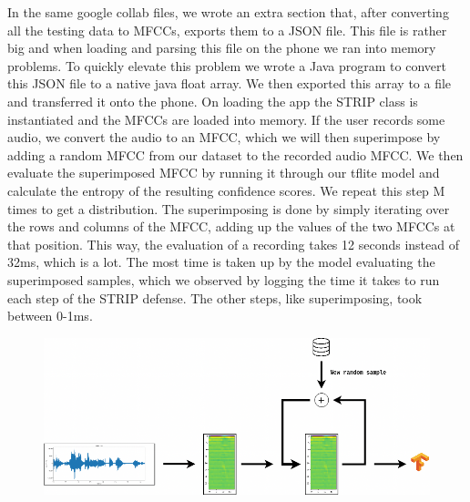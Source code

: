 \documentclass{report}
\theoremstyle{definition}
\theoremstyle{remark}
\begin{document}
In the same google collab files, we wrote an extra section that, after converting all the testing data to MFCCs, exports them to a JSON file. This file is rather big and when loading and parsing this file on the phone we ran into memory problems. To quickly elevate this problem we wrote a Java program to convert this JSON file to a native java float array. We then exported this array to a file and transferred it onto the phone. On loading the app the STRIP class is instantiated and the MFCCs are loaded into memory. If the user records some audio, we convert the audio to an MFCC, which we will then superimpose by adding a random MFCC from our dataset to the recorded audio MFCC. We then evaluate the superimposed MFCC by running it through our tflite model and calculate the entropy of the resulting confidence scores. We repeat this step M times to get a distribution. The superimposing is done by simply iterating over the rows and columns of the MFCC, adding up the values of the two MFCCs at that position. This way, the evaluation of a recording takes 12 seconds instead of 32ms, which is a lot. The most time is taken up by the model evaluating the superimposed samples, which we observed by logging the time it takes to run each step of the STRIP defense. The other steps, like superimposing, took between 0-1ms.

\begin{center}
    \begin{figure}[!hbt]
        \includegraphics[scale=0.45]{img/Strip.drawio.png}
    \end{figure}
\end{center}


\end{document}
